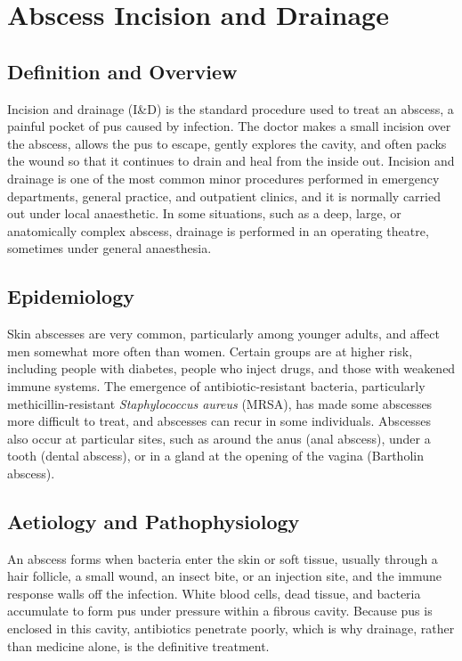 \chapter{Abscess Incision and Drainage}

\section*{Definition and Overview}
Incision and drainage (I\&D) is the standard procedure used to treat an abscess, a painful pocket of pus caused by infection. The doctor makes a small incision over the abscess, allows the pus to escape, gently explores the cavity, and often packs the wound so that it continues to drain and heal from the inside out. Incision and drainage is one of the most common minor procedures performed in emergency departments, general practice, and outpatient clinics, and it is normally carried out under local anaesthetic. In some situations, such as a deep, large, or anatomically complex abscess, drainage is performed in an operating theatre, sometimes under general anaesthesia.

\section*{Epidemiology}
Skin abscesses are very common, particularly among younger adults, and affect men somewhat more often than women. Certain groups are at higher risk, including people with diabetes, people who inject drugs, and those with weakened immune systems. The emergence of antibiotic-resistant bacteria, particularly methicillin-resistant \textit{Staphylococcus aureus} (MRSA), has made some abscesses more difficult to treat, and abscesses can recur in some individuals. Abscesses also occur at particular sites, such as around the anus (anal abscess), under a tooth (dental abscess), or in a gland at the opening of the vagina (Bartholin abscess).

\section*{Aetiology and Pathophysiology}
An abscess forms when bacteria enter the skin or soft tissue, usually through a hair follicle, a small wound, an insect bite, or an injection site, and the immune response walls off the infection. White blood cells, dead tissue, and bacteria accumulate to form pus under pressure within a fibrous cavity. Because pus is enclosed in this cavity, antibiotics penetrate poorly, which is why drainage, rather than medicine alone, is the definitive treatment.

